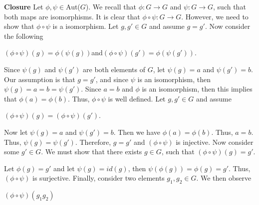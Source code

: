 \documentclass[12pt, a4paper]{article}
\begin{document}
\begin{description}
    
    \item \textbf{Closure }Let $\phi,\psi\in$Aut($G$). We recall that $\phi\colon G\rightarrow G$ and $\psi\colon G\rightarrow G$, such that both maps are isomorphisms. It is clear that $\phi\circ\psi\colon G\rightarrow G$. However, we need to show that $\phi\circ\psi$ is a isomorphism. Let $g,g'\in G$ and assume $g=g'$. Now consider the following\par
    
\vspace{4mm}

        \centerline{$(\phi\circ\psi)(g)=\phi(\psi(g))$\hspace{5mm}and\hspace{5mm}$(\phi\circ\psi)(g')=\phi(\psi(g'))$.}
        
\vspace{4mm}

    Since $\psi(g)$ and $\psi(g')$ are both elements of $G$, let $\psi(g)=a$ and $\psi(g')=b$. Our assumption is that $g=g'$, and since $\psi$ is an isomorphism, then $\psi(g)=a=b=\psi(g')$. Since $a=b$ and $\phi$ is an isomorphism, then this implies that $\phi(a)=\phi(b)$. Thus, $\phi\circ\psi$ is well defined. Let $g,g'\in G$ and assume\par
    
\vspace{4mm}

        \centerline{$(\phi\circ\psi)(g)=(\phi\circ\psi)(g')$.}
        
\vspace{4mm}

    Now let $\psi(g)=a$ and $\psi(g')=b$. Then we have $\phi(a)=\phi(b)$. Thus, $a=b$. Thus, $\psi(g)=\psi(g')$. Therefore, $g=g'$ and $(\phi\circ\psi)$ is injective. Now consider some $g'\in G$. We must show that there exists $g\in G$, such that $(\phi\circ\psi)(g)=g'$.
    
\newpage

    Let $\phi(g)=g'$ and let $\psi(g)=id(g)$, then $\psi(\phi(g))=\phi(g)=g'$. Thus, $(\phi\circ\psi)$ is surjective. Finally, consider two elements $g_1,g_2\in G$. We then observe\par
    
\vspace{4mm}

\hspace{10mm} $(\phi\circ\psi)(g_1g_2)$


\end{description}
\end{document}
